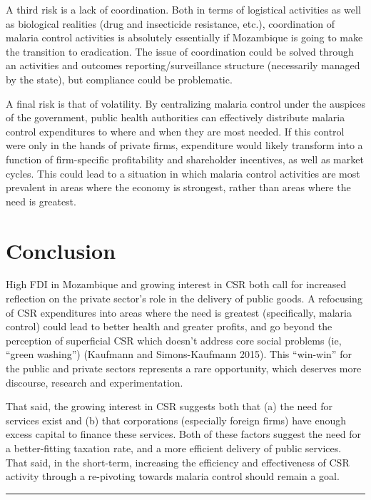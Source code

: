\documentclass[]{article}
\begin{document}
A third risk is a lack of coordination. Both in terms of logistical
activities as well as biological realities (drug and insecticide
resistance, etc.), coordination of malaria control activities is
absolutely essentially if Mozambique is going to make the transition to
eradication. The issue of coordination could be solved through an
activities and outcomes reporting/surveillance structure (necessarily
managed by the state), but compliance could be problematic.

A final risk is that of volatility. By centralizing malaria control
under the auspices of the government, public health authorities can
effectively distribute malaria control expenditures to where and when
they are most needed. If this control were only in the hands of private
firms, expenditure would likely transform into a function of
firm-specific profitability and shareholder incentives, as well as
market cycles. This could lead to a situation in which malaria control
activities are most prevalent in areas where the economy is strongest,
rather than areas where the need is greatest.

\section{Conclusion}\label{conclusion}

High FDI in Mozambique and growing interest in CSR both call for
increased reflection on the private sector's role in the delivery of
public goods. A refocusing of CSR expenditures into areas where the need
is greatest (specifically, malaria control) could lead to better health
and greater profits, and go beyond the perception of superficial CSR
which doesn't address core social problems (ie, ``green washing'')
(Kaufmann and Simons-Kaufmann 2015). This ``win-win'' for the public and
private sectors represents a rare opportunity, which deserves more
discourse, research and experimentation.

That said, the growing interest in CSR suggests both that (a) the need
for services exist and (b) that corporations (especially foreign firms)
have enough excess capital to finance these services. Both of these
factors suggest the need for a better-fitting taxation rate, and a more
efficient delivery of public services. That said, in the short-term,
increasing the efficiency and effectiveness of CSR activity through a
re-pivoting towards malaria control should remain a goal.

\begin{center}\rule{0.5\linewidth}{\linethickness}\end{center}
\end{document}
